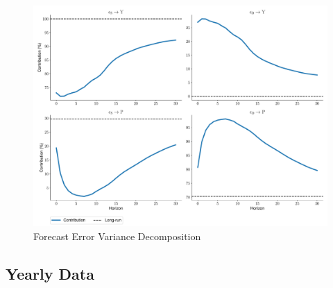\documentclass[a4paper,12pt]{article}
\begin{document}
\blindtext

\begin{figure}[H]
    \centering
\caption{Forecast Error Variance Decomposition}
    \includegraphics[width=\textwidth]{../output/figures/FEVD.pdf} 
\end{figure}
\pagebreak

\begin{appendices}
\section{Yearly Data}

\begin{table}[h]
\centering

\end{table}

\end{appendices}

\pagebreak


\end{document}
